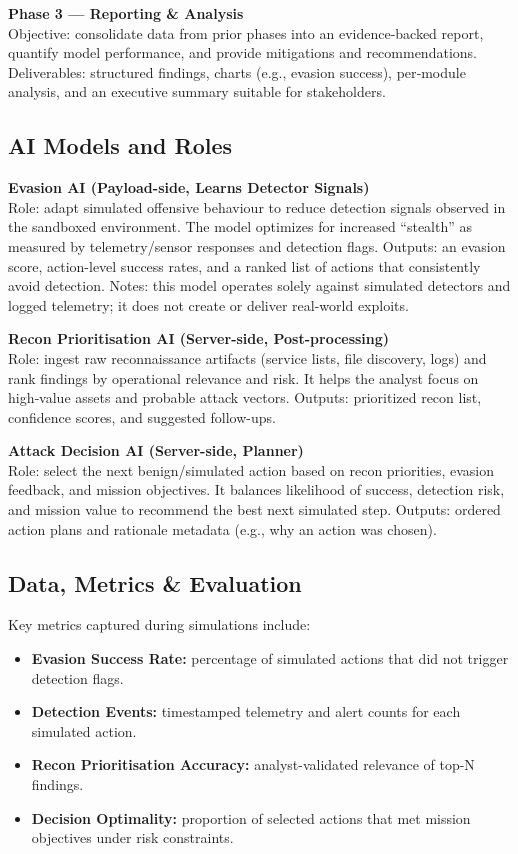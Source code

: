 \documentclass[a4paper,12pt]{article}
\begin{document}
\textbf{Phase 3 — Reporting \& Analysis} \\
Objective: consolidate data from prior phases into an evidence-backed report, quantify model performance, and provide mitigations and recommendations.  
Deliverables: structured findings, charts (e.g., evasion success), per‑module analysis, and an executive summary suitable for stakeholders.

\subsection*{AI Models and Roles}
\textbf{Evasion AI (Payload-side, Learns Detector Signals)} \\
Role: adapt simulated offensive behaviour to reduce detection signals observed in the sandboxed environment. The model optimizes for increased “stealth” as measured by telemetry/sensor responses and detection flags.  
Outputs: an evasion score, action-level success rates, and a ranked list of actions that consistently avoid detection.  
Notes: this model operates solely against simulated detectors and logged telemetry; it does not create or deliver real-world exploits.

\textbf{Recon Prioritisation AI (Server-side, Post-processing)} \\
Role: ingest raw reconnaissance artifacts (service lists, file discovery, logs) and rank findings by operational relevance and risk. It helps the analyst focus on high‑value assets and probable attack vectors.  
Outputs: prioritized recon list, confidence scores, and suggested follow-ups.

\textbf{Attack Decision AI (Server-side, Planner)} \\
Role: select the next benign/simulated action based on recon priorities, evasion feedback, and mission objectives. It balances likelihood of success, detection risk, and mission value to recommend the best next simulated step.  
Outputs: ordered action plans and rationale metadata (e.g., why an action was chosen).

\subsection*{Data, Metrics \& Evaluation}
Key metrics captured during simulations include:
\begin{itemize}
    \item \textbf{Evasion Success Rate:} percentage of simulated actions that did not trigger detection flags.
    \item \textbf{Detection Events:} timestamped telemetry and alert counts for each simulated action.
    \item \textbf{Recon Prioritisation Accuracy:} analyst-validated relevance of top-N findings.
    \item \textbf{Decision Optimality:} proportion of selected actions that met mission objectives under risk constraints.
\end{itemize}
\end{document}
